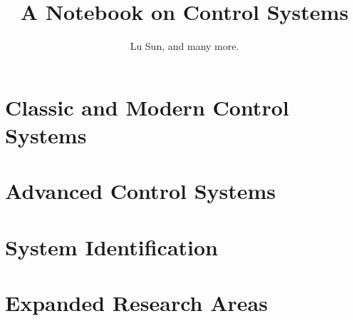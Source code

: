 



\makeindex



\frontmatter

\title{A Notebook on Control Systems}
\author{Lu Sun, and many more.}

\maketitle


\tableofcontents


\listoffigures
\listoftables

\mainmatter

\part{Classic and Modern Control Systems}







\part{Advanced Control Systems}







\part{System Identification}







\part{Expanded Research Areas}





\appendix









\printindex


